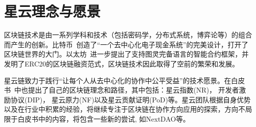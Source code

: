 \section{星云理念与愿景}
区块链技术是由一系列学科和技术（包括密码学，分布式系统，博弈论等）的组合而产生的创新。比特币~\cite{Nakamoto2008}创造了“⼀个去中⼼化电⼦现⾦系统”的完美设计，打开了区块链世界的大门。以太坊~\cite{buterin2013ethereum}进一步提出了支持图灵完备语言的智能合约框架，并发明了ERC20的区块链融资范式，区块链技术因此取得了空前的繁荣和发展。

星云链致力于践行“让每个人从去中心化的协作中公平受益”的技术愿景。在白皮书~\cite{TechWhitepaper}中也提出了自己的区块链理念和路径，其中包括：星云指数(NR)， 开发者激励协议(DIP)， 星云原力(NF)以及星云贡献证明(PoD)等。星云团队根据自身优势以及在行业中积累的经验，将继续专注于区块链在协作方向应用的探索，方向不局限于白皮书中的内容，将包含一些新的尝试, 如NextDAO等。
